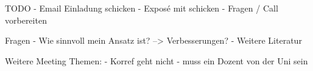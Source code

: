 TODO
- Email Einladung schicken
- Exposé mit schicken
- Fragen / Call vorbereiten

Fragen
- Wie sinnvoll mein Ansatz ist?
--> Verbesserungen?
- Weitere Literatur

Weitere Meeting Themen:
- Korref geht nicht
- muss ein Dozent von der Uni sein
